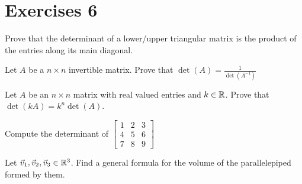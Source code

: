 \section{Exercises 6}
\begin{exercise}
    Prove that the determinant of a lower/upper triangular matrix is the product of the entries along its main diagonal.
\end{exercise}
\begin{exercise}
    Let $A$ be a $n\times n$ invertible matrix. Prove that $\det(A)=\frac{1}{\det(A^{-1})}$
\end{exercise}
\begin{exercise}
    Let $A$ be an $n\times n$ matrix with real valued entries and $k\in\mathbb{R}$. Prove that $\det(kA)=k^n\det(A)$.
\end{exercise}
\begin{exercise}
    Compute the determinant of
    $\begin{bmatrix}
        1 & 2 & 3\\
        4 & 5 & 6\\
        7 & 8 & 9
    \end{bmatrix}$
\end{exercise}
\begin{exercise}
    Let $\vec{v}_1,\vec{v}_2,\vec{v}_3\in\mathbb{R}^3$. Find a general formula for the volume of the parallelepiped formed by them.
\end{exercise}